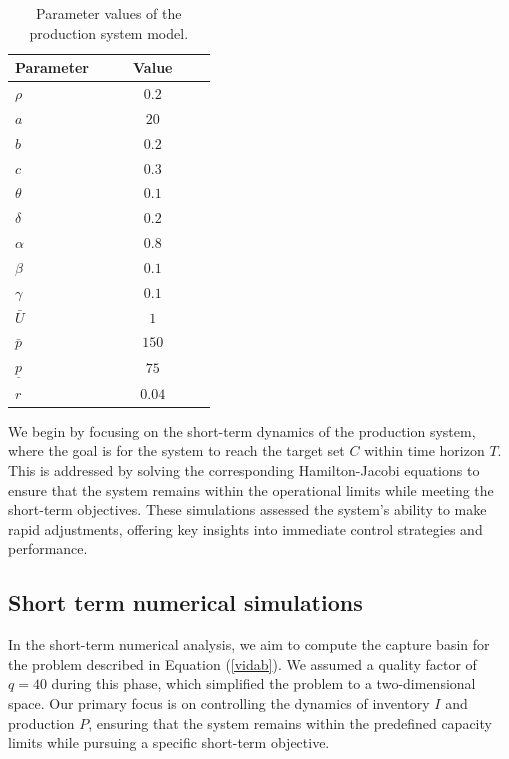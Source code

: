 \documentclass[]{interact}
\theoremstyle{plain}%
\theoremstyle{definition}
\theoremstyle{remark}
\begin{document}
\begin{table}[htbp]
\centering
\caption{Parameter values of the production system model.}
\label{parameters1}
\begin{tabular}{p{0.4\linewidth}c}
\toprule
\textbf{Parameter} & \textbf{Value} \\
\midrule
\(\rho\) & \(0.2\) \\
\(a\) & \(20\) \\
\(b\) & \(0.2\) \\
\(c\) & \(0.3\) \\
\(\theta\) & \(0.1\) \\
\(\delta\) & \(0.2\) \\
\(\alpha\) & \(0.8\) \\
\(\beta\) & \(0.1\) \\
\(\gamma\) & \(0.1\) \\
\(\bar{U}\) & \(1\) \\
\(\bar{p}\) & \(150\) \\
\(\underline{p}\) & \(75\) \\
\(r\) & \(0.04\) \\
\bottomrule
\end{tabular}
\end{table}



We begin by focusing on the short-term dynamics of the production system, where the goal is for the system to reach the target set $C$ within time horizon $T$. This is addressed by solving the corresponding Hamilton-Jacobi equations to ensure that the system remains within the operational limits while meeting the short-term objectives. These simulations assessed the system's ability to make rapid adjustments, offering key insights into immediate control strategies and performance.



\subsection{Short term numerical simulations}\label{shortnumeric}
In the short-term numerical analysis, we aim to compute the capture basin for the problem described in Equation (\ref{vidab}). We assumed a quality factor of \( q = 40\) during this phase, which simplified the problem to a two-dimensional space. Our primary focus is on controlling the dynamics of inventory \( I \) and production \( P \), ensuring that the system remains within the predefined capacity limits while pursuing a specific short-term objective.
\end{document}
